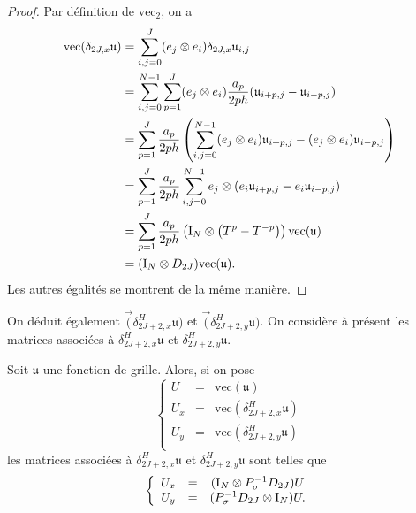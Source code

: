 \begin{proof}
Par définition de $\text{vec}_2$, on a 
\begin{align*}
\text{vec} (\delta_{2J,x} \mathfrak{u}) & = \displaystyle\sum\limits_{i,j=0}^J (e_j \otimes e_i) \delta_{2J,x} \mathfrak{u}_{i,j} \\
	& = \displaystyle\sum\limits_{i,j=0}^{N-1} \displaystyle\sum\limits_{p=1}^J (e_j \otimes e_i) \dfrac{a_p}{2ph} (\mathfrak{u}_{i+p,j} - \mathfrak{u}_{i-p,j}) \\
	& = \displaystyle\sum\limits_{p=1}^J \dfrac{a_p}{2ph} \left( \displaystyle\sum\limits_{i,j=0}^{N-1} (e_j \otimes e_i) \mathfrak{u}_{i+p,j} - (e_j \otimes e_i) \mathfrak{u}_{i-p,j} \right) \\
	& = \displaystyle\sum\limits_{p=1}^J \dfrac{a_p}{2ph} \displaystyle\sum\limits_{i,j=0}^{N-1} e_j \otimes (e_i \mathfrak{u}_{i+p,j} - e_i\mathfrak{u}_{i-p,j})\\
	& = \displaystyle\sum\limits_{p=1}^J \dfrac{a_p}{2ph} \left( \text{I}_N \otimes \left( T^p - T^{-p}  \right) \right) \text{vec} (\mathfrak{u}) \\
	& = (\text{I}_N \otimes D_{2J}) \text{vec} (\mathfrak{u}).
\end{align*}
Les autres égalités se montrent de la même manière.
\end{proof}
On déduit également $\vec(\delta_{2J+2,x}^H \mathfrak{u})$ et $\vec(\delta_{2J+2,y}^H \mathfrak{u})$.
On considère à présent les matrices associées à $\delta^H_{2J+2,x} \mathfrak{u}$ et $\delta^H_{2J+2,y} \mathfrak{u}$.
\begin{theoreme}
Soit $\mathfrak{u}$ une fonction de grille. Alors, si on pose 
\begin{equation}
\left\lbrace
\begin{array}{rcl}
U & = & \text{vec} (\mathfrak{u}) \\
U_x & = & \text{vec} (\delta_{2J+2,x}^H \mathfrak{u}) \\
U_y & = & \text{vec} (\delta_{2J+2,y}^H \mathfrak{u}) \\
\end{array}
\right.
\end{equation}
les matrices associées à $\delta^H_{2J+2,x} \mathfrak{u}$ et $\delta^H_{2J+2,y} \mathfrak{u}$ sont telles que 
\begin{equation}
\left\lbrace
\begin{array}{rcccl}
U_x &=& (\text{I}_N \otimes P^{-1}_{\sigma} D_{2J})U \\
U_y &=& (P^{-1}_{\sigma}D_{2J} \otimes \text{I}_N)U.
\end{array}
\right.
\end{equation}
\end{theoreme}

